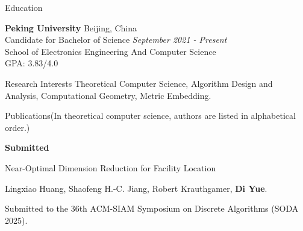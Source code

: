 \documentclass{resume} %
\begin{document}

\begin{rSection}{Education}

{\bf Peking University} \hfill {Beijing, China} 
\\ Candidate for Bachelor of Science \hfill {\em September 2021 - Present}
\\ School of Electronics Engineering And Computer Science
\\ GPA: 3.83/4.0



\end{rSection}

\begin{rSection}{Research Interests}{}
Theoretical Computer Science, Algorithm Design and Analysis, Computational Geometry, Metric Embedding.
\end{rSection}

\begin{rSection}{Publications}{(In theoretical computer science, authors are listed in alphabetical order.)}
    \begin{center}
        {\bf Submitted}
    \end{center}

    \begin{pubSubsection}{Near-Optimal Dimension Reduction for Facility Location}
        \item Lingxiao Huang, Shaofeng H.-C. Jiang, Robert Krauthgamer, \textbf{Di Yue}.
        \item Submitted to the 36th ACM-SIAM Symposium on Discrete Algorithms (SODA 2025).
    \end{pubSubsection}
\end{rSection}
\end{document}
